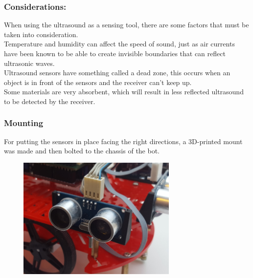 \subsubsection{Considerations:}
When using the ultrasound as a sensing tool, there are some factors that must be taken into consideration.\\ Temperature and humidity can affect the speed of sound, just as air currents have been known to be able to create invisible boundaries that can reflect ultrasonic waves.\\
Ultrasound sensors have something called a dead zone, this occurs when an object is in front of the sensors and the receiver can't keep up.\\
Some materials are very absorbent, which will result in less reflected ultrasound to be detected by the receiver.

\subsubsection{Mounting}

For putting the sensors in place facing the right directions, a 3D-printed mount was made and then bolted to the chassis of the bot. 

\begin{figure}[!ht]
	\centering
	\includegraphics[width=0.7\textwidth]{figures/Mount1.png}
	\caption{}
	\label{Mount}
\end{figure}


